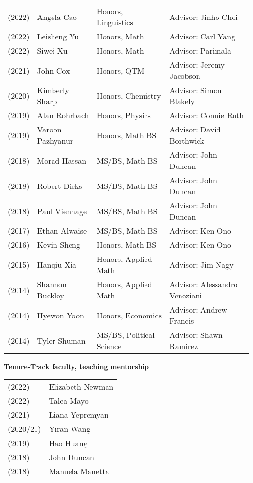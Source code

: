\documentclass[margin,line]{res}
\begin{document}
\begin{resume}
\begin{tabular}{llll}
(2022) & Angela Cao & Honors, Linguistics & Advisor: Jinho Choi\\
(2022) & Leisheng Yu & Honors, Math &  Advisor: Carl Yang\\
(2022) & Siwei Xu& Honors, Math &  Advisor: Parimala\\    
(2021) & John Cox  & Honors, QTM & Advisor: Jeremy Jacobson\\    
(2020) & Kimberly Sharp & Honors, Chemistry & Advisor: Simon Blakely\\  
(2019) & Alan Rohrbach & Honors, Physics & Advisor:  Connie Roth\\
(2019) & Varoon Pazhyanur & Honors, Math BS & Advisor:  David Borthwick\\
(2018) & Morad Hassan & MS/BS, Math BS & Advisor:  John Duncan\\
(2018) & Robert Dicks & MS/BS, Math BS & Advisor:  John Duncan\\
(2018) & Paul Vienhage & MS/BS, Math BS & Advisor:  John Duncan\\
(2017) & Ethan Alwaise & MS/BS, Math BS & Advisor:  Ken Ono\\
(2016) & Kevin Sheng & Honors, Math BS & Advisor:  Ken Ono \\
(2015) & Hanqiu Xia   & Honors, Applied Math & Advisor:  Jim Nagy\\
(2014) & Shannon Buckley & Honors, Applied Math & Advisor:  Alessandro Veneziani\\
(2014) & Hyewon Yoon & Honors, Economics & Advisor:  Andrew Francis\\
(2014) & Tyler Shuman & MS/BS, Political Science & Advisor:  Shawn Ramirez\\
\end{tabular}


{\bf Tenure-Track faculty, teaching mentorship}
\vspace*{-.15in}

\begin{tabular}{ll}
  (2022) & Elizabeth Newman \\
  (2022) & Talea Mayo \\  
  (2021) & Liana Yepremyan \\
  (2020/21) & Yiran Wang \\    
  (2019) & Hao Huang\\
  (2018) & John Duncan \\
  (2018) & Manuela Manetta 
\end{tabular}


\end{resume}
\end{document}
